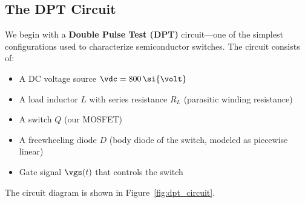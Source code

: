 
\subsection{The DPT Circuit}

We begin with a \textbf{Double Pulse Test (DPT)} circuit—one of the simplest configurations used to characterize semiconductor switches. The circuit consists of:

\begin{itemize}
    \item A DC voltage source $\vdc = 800\,\si{\volt}$
    \item A load inductor $L$ with series resistance $R_L$ (parasitic winding resistance)
    \item A switch $Q$ (our MOSFET)
    \item A freewheeling diode $D$ (body diode of the switch, modeled as piecewise linear)
    \item Gate signal $\vgs(t)$ that controls the switch
\end{itemize}

\noindent The circuit diagram is shown in Figure~\ref{fig:dpt_circuit}.

